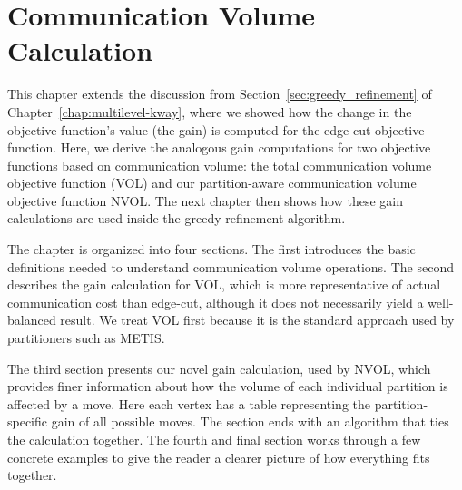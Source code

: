 \chapter{Communication Volume Calculation} \label{cv_calculation}
This chapter extends the discussion from Section~\ref{sec:greedy_refinement} of Chapter~\ref{chap:multilevel-kway}, where we showed how the change in the objective function's value (the gain) is computed for the edge-cut objective function. Here, we derive the analogous gain computations for two objective functions based on communication volume: the total communication volume objective function (VOL) and our partition-aware communication volume objective function NVOL. The next chapter then shows how these gain calculations are used inside the greedy refinement algorithm.

The chapter is organized into four sections. The first introduces the basic definitions needed to understand communication volume operations. The second describes the gain calculation for VOL, which is more representative of actual communication cost than edge-cut, although it does not necessarily yield a well-balanced result. We treat VOL first because it is the standard approach used by partitioners such as METIS.

The third section presents our novel gain calculation, used by NVOL, which provides finer information about how the volume of each individual partition is affected by a move. Here each vertex has a table representing the partition-specific gain of all possible moves. The section ends with an algorithm that ties the calculation together. The fourth and final section works through a few concrete examples to give the reader a clearer picture of how everything fits together.

